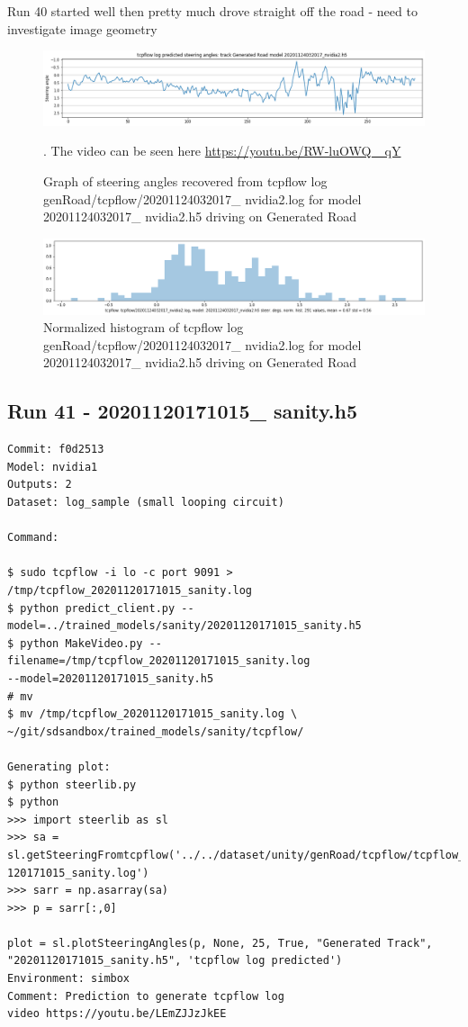 Run 40 started well then pretty much drove straight off the road - need to investigate image
geometry
\begin{figure}[ht]
 \centering 
 \includegraphics[width=\textwidth]{Figures/tcpflow_20201124032017_nvidia2_graph.png}
 \caption{Graph of steering angles recovered from tcpflow log genRoad/tcpflow/20201124032017\_ nvidia2.log for model 20201124032017\_ nvidia2.h5 driving on Generated Road}. The video can be seen here \href{https://youtu.be/RW-luOWQ\_ qY}{https://youtu.be/RW-luOWQ\_ qY}
 \label{fig:tcpflow_20201124032017_nvidia2_graph}
\end{figure}

\begin{figure}[ht]
 \centering 
 \includegraphics[width=\textwidth]{Figures/tcpflow_20201124032017_nvidia2_bins.png}
 \caption{Normalized histogram of tcpflow log genRoad/tcpflow/20201124032017\_ nvidia2.log for model 20201124032017\_ nvidia2.h5 driving on Generated Road}
 \label{fig:tcpflow_20201124032017_nvidia2_bins} 
\end{figure} 


\subsection{Run 41 - 20201120171015\_ sanity.h5}
\label{app_res:41}
\label{}
\begin{verbatim}
Commit: f0d2513
Model: nvidia1
Outputs: 2
Dataset: log_sample (small looping circuit)

Command: 

$ sudo tcpflow -i lo -c port 9091 > /tmp/tcpflow_20201120171015_sanity.log
$ python predict_client.py --model=../trained_models/sanity/20201120171015_sanity.h5
$ python MakeVideo.py --filename=/tmp/tcpflow_20201120171015_sanity.log
--model=20201120171015_sanity.h5
# mv
$ mv /tmp/tcpflow_20201120171015_sanity.log \ 
~/git/sdsandbox/trained_models/sanity/tcpflow/

Generating plot:
$ python steerlib.py
$ python 
>>> import steerlib as sl
>>> sa = sl.getSteeringFromtcpflow('../../dataset/unity/genRoad/tcpflow/tcpflow_20201
120171015_sanity.log')
>>> sarr = np.asarray(sa)
>>> p = sarr[:,0]

plot = sl.plotSteeringAngles(p, None, 25, True, "Generated Track",
"20201120171015_sanity.h5", 'tcpflow log predicted')
Environment: simbox
Comment: Prediction to generate tcpflow log
video https://youtu.be/LEmZJJzJkEE
\end{verbatim}

